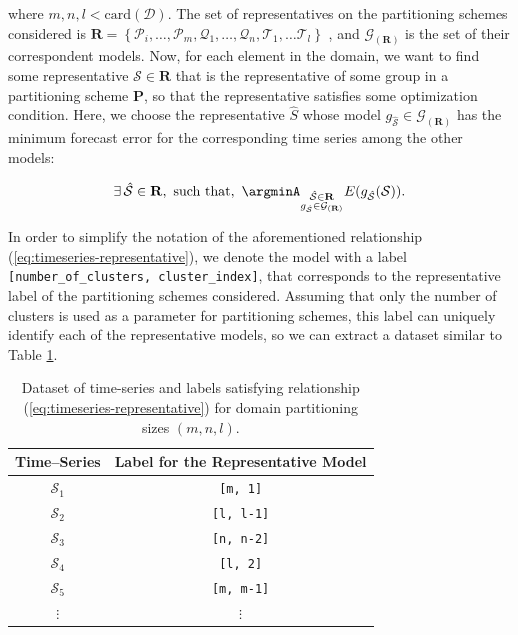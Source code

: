 where $m, n, l < \textrm{card}(\mathcal{D})$. The set of representatives on the partitioning schemes considered is $\mathbf{R} = \left\{\mathcal{P}_{i}, \ldots, \mathcal{P}_{m}, \mathcal{Q}_{1}, \ldots, \mathcal{Q}_{n}, \mathcal{T}_{1}, \ldots \mathcal{T}_{l} \right\}$ , and $\mathcal{G}_{(\mathbf{R})}$ is the set of their correspondent models. Now, for each element in the domain, we want to find some representative $\mathcal{S} \in \mathbf{R}$ that is the representative of some group in a partitioning scheme $\mathbf{P}$, so that the representative satisfies some optimization condition. Here, we choose the representative $\hat{S}$ whose model $g_{\mathcal{\hat{S}}} \in \mathcal{G}_{(\mathbf{R})}$ has the minimum forecast error for the corresponding time series among the other models:

\begin{equation}\label{eq:timeseries-representative}
\exists\, \mathcal{\hat{S}} \in \mathbf{R}, \,\, \textrm{such that}, \,\, \argminA_{\substack{\mathcal{\hat{S}} \in \mathbf{R}\\g_{\mathcal{\hat{S}}} \in \mathcal{G}_{(\mathbf{R})}}} E (g_{\mathcal{\hat{S}}}(\mathcal{S})).
\end{equation}

In order to simplify the notation of the aforementioned relationship (\ref{eq:timeseries-representative}), we denote the model with a label \texttt{[number\_of\_clusters, cluster\_index]}, that corresponds to the representative label of the partitioning schemes considered. Assuming that only the number of clusters is used as a parameter for partitioning schemes, this label can uniquely identify each of the representative models, so we can extract a dataset similar to Table \ref{Tab:TSClassificationDataset}.

\begin{table}[h]
	\centering
	\begin{tabular}{|c|c|}
		\hline
		Time--Series   & Label for the Representative Model\\ \hline
		$\mathcal{S}_{1}$  & \texttt{[m, 1]} \\ \hline
		$\mathcal{S}_{2}$ & \texttt{[l, l-1]} \\ \hline
		$\mathcal{S}_{3}$ & \texttt{[n, n-2]} \\ \hline
		$\mathcal{S}_{4}$ & \texttt{[l, 2]} \\ \hline
		$\mathcal{S}_{5}$ & \texttt{[m, m-1]} \\ \hline
		$\vdots$       & $\vdots$ \\ \hline
	\end{tabular}
	\caption{Dataset of time-series and labels satisfying relationship (\ref{eq:timeseries-representative}) for domain partitioning sizes $(m,n,l)$.}
	\label{Tab:TSClassificationDataset}
\end{table}

